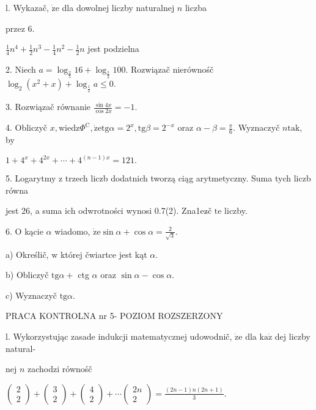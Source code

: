 \documentclass[a4paper,12pt]{article}
\begin{document}
l. Wykazač, $\dot{\mathrm{z}}\mathrm{e}$ dla dowolnej liczby naturalnej $n$ liczba

przez 6.

$\displaystyle \frac{1}{4}n^{4}+\frac{1}{2}n^{3}-\frac{1}{4}n^{2}-\frac{1}{2}n$ jest podzielna

2. Niech $a=\log_{\frac{2}{5}}16+\log_{\frac{5}{2}}100$. Rozwiązač nierównośč $\log_{2}(x^{2}+x)+\log_{\frac{1}{2}}a\leq 0.$

3. Rozwiązač równanie $\displaystyle \frac{\sin 4x}{\cos 2x}=-1.$

4. Obliczyč $x, \mathrm{w}\mathrm{i}\mathrm{e}\mathrm{d}\mathrm{z}\Phi^{\mathrm{C}}, \dot{\mathrm{z}}\mathrm{e}\mathrm{t}\mathrm{g}\alpha = 2^{x}, \mathrm{t}\mathrm{g}\beta= 2^{-x}$ oraz $\alpha-\beta= \displaystyle \frac{\pi}{6}$. Wyznaczyč $n\mathrm{t}\mathrm{a}\mathrm{k}$, by

$1+4^{x}+4^{2x}+\cdots+4^{(n-1)x}=121.$

5. Logarytmy $\mathrm{z}$ trzech liczb dodatnich tworzą ciąg arytmetyczny. Suma tych liczb równa

jest 26, a suma ich odwrotności wynosi 0.7(2). Zna1ez$\acute{}$č $\mathrm{t}\mathrm{e}$ liczby.

6. $\mathrm{O}$ kącie $\alpha$ wiadomo, $\displaystyle \dot{\mathrm{z}}\mathrm{e}\sin\alpha+\cos\alpha=\frac{2}{\sqrt{3}}.$

a) Określič, $\mathrm{w}$ której čwiartce jest kąt $\alpha.$

b) Obliczyč $\mathrm{t}\mathrm{g}\alpha+$ ctg $\alpha$ oraz $\sin\alpha-\cos\alpha.$

c) Wyznaczyč $\mathrm{t}\mathrm{g}\alpha.$





PRACA KONTROLNA nr 5- POZIOM ROZSZERZONY

l. Wykorzystując zasade indukcji matematycznej udowodnič, $\dot{\mathrm{z}}\mathrm{e}$ dla $\mathrm{k}\mathrm{a}\dot{\mathrm{z}}$ dej liczby natural-

nej $n$ zachodzi równośč

$\left(\begin{array}{l}
2\\
2
\end{array}\right) + \left(\begin{array}{l}
3\\
2
\end{array}\right) + \left(\begin{array}{l}
4\\
2
\end{array}\right) +\cdots\left(\begin{array}{l}
2n\\
2
\end{array}\right) =\displaystyle \frac{(2n-1)n(2n+1)}{3}.$
\end{document}
